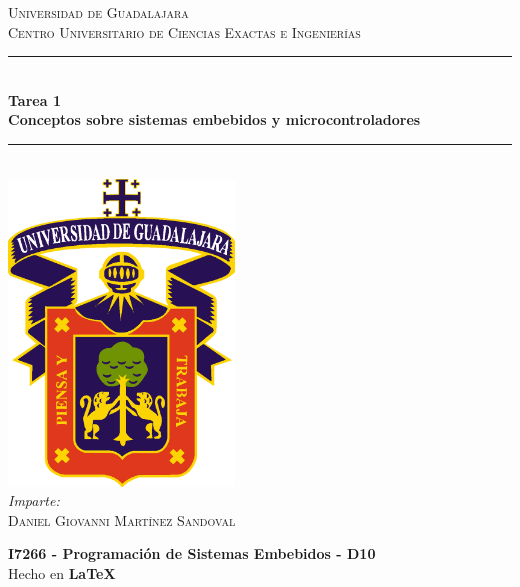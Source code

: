 \documentclass[10pt,letterpaper]{article}
\newcommand{\HRule}{\rule{\linewidth}{0.5mm}} %
\begin{document}

\begin{titlepage}
    \center
    
    \textsc{\LARGE Universidad de Guadalajara}\\[0.2cm] %
    \textsc{Centro Universitario de Ciencias Exactas e Ingenierías}\\[1cm]
    
    \HRule \\[0.3cm]
    { 
        \LARGE \textbf{Tarea 1} \\[0.3cm]
        \large \textbf{Conceptos sobre sistemas embebidos y microcontroladores} \\[0.3cm]
    }
    \HRule \\[2cm]
    
    \includegraphics[width=6cm]{logo_udg_color.eps}\\[1.25cm] %
    
    \center
    \vspace{1cm}
    \emph{Imparte:} \\ %
    \textsc{Daniel Giovanni Martínez Sandoval} 
    
    \vfill
    \textbf{I7266 - Programación de Sistemas Embebidos - D10} \\
    Hecho en \textbf{\LaTeX}	
\end{titlepage}



\end{document}
